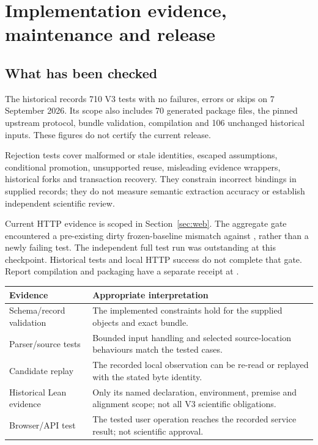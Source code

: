\section{Implementation evidence, maintenance and release}\label{sec:release}

\subsection{What has been checked}

The historical  records 710 V3 tests with no failures, errors or skips on 7 September 2026. Its scope also includes 70 generated package files, the pinned upstream protocol, bundle validation, compilation and 106 unchanged historical inputs. These figures do not certify the current release.

Rejection tests cover malformed or stale identities, escaped assumptions, conditional promotion, unsupported reuse, misleading evidence wrappers, historical forks and transaction recovery. They constrain incorrect bindings in supplied records; they do not measure semantic extraction accuracy or establish independent scientific review.

Current HTTP evidence is scoped in Section~\ref{sec:web}. The aggregate gate encountered a pre-existing dirty frozen-baseline mismatch against , rather than a newly failing test. The independent full test run was outstanding at this checkpoint. Historical tests and local HTTP success do not complete that gate. Report compilation and packaging have a separate receipt at .

\begin{tabularx}{\linewidth}{@{}P{35mm}X@{}}
\toprule
Evidence & Appropriate interpretation \\
\midrule
Schema/record validation & The implemented constraints hold for the supplied objects and exact bundle. \\
Parser/source tests & Bounded input handling and selected source-location behaviours match the tested cases. \\
Candidate replay & The recorded local observation can be re-read or replayed with the stated byte identity. \\
Historical Lean evidence & Only its named declaration, environment, premise and alignment scope; not all V3 scientific obligations. \\
Browser/API test & The tested user operation reaches the recorded service result; not scientific approval. \\
\bottomrule
\end{tabularx}

